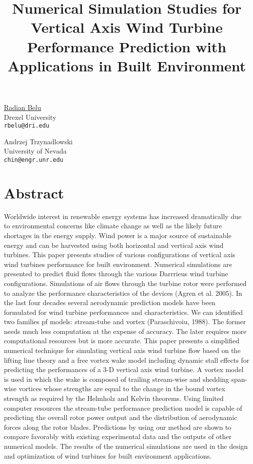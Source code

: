 \title{Numerical Simulation Studies for Vertical Axis Wind Turbine Performance Prediction with Applications in Built Environment}
\author{} \institute{}
\maketitle

\begin{center}
{\large \underline{Radian Belu}}\\
Drexel University\\
{\tt rbelu@dri.edu}\\
\vspace{4mm}

{\large Andrzej Trzynadlowski}\\
University of Nevada\\
{\tt chin@engr.unr.edu}
\end{center}

\section*{Abstract}
Worldwide interest in renewable energy systems has increased dramatically due to environmental concerns like climate change as well as the likely future shortages in the energy supply. Wind power is a major source of sustainable energy and can be harvested using both horizontal and vertical axis wind turbines. This paper presents studies of various configurations of vertical axis wind turbines performance for built environment. Numerical simulations are presented to predict fluid flows through the various Darrrieus wind turbine configurations. Simulations of air flows through the turbine rotor were performed to analyze the performance characteristics of the devices (Agren et al. 2005). In the last four decades several aerodynamic prediction models have been formulated for wind turbine performances and characteristics. We can identified two families pf models: stream-tube and vortex (Paraschivoiu, 1988). The former needs much less computation at the expense of accuracy. The later requires more computational resources but is more accurate. This paper presents a simplified numerical technique for simulating vertical axis wind turbine flow based on the lifting line theory and a free vortex wake model including dynamic stall effects for predicting the performances of a 3-D vertical axis wind turbine. A vortex model is used in which the wake is composed of trailing stream-wise and shedding span-wise vortices whose strengths are equal to the change in the bound vortex strength as required by the Helmholz and Kelvin theorems. Using limited computer resources the stream-tube performance prediction model is capable of predicting the overall rotor power output and the distribution of aerodynamic forces along the rotor blades. Predictions by using our method are shown to compare favorably with existing experimental data and the outputs of other numerical models. The results of the numerical simulations are used in the design and optimization of wind turbines for built environment applications.     

